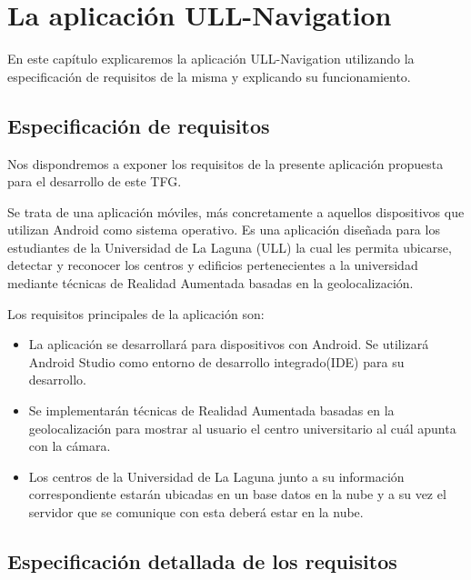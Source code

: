 %
%
%

\chapter{La aplicación ULL-Navigation} \label{chap:LaAplicacion} 

En este capítulo explicaremos la aplicación ULL-Navigation utilizando la especificación de requisitos de la misma y explicando su funcionamiento.

\section{Especificación de requisitos} %

Nos dispondremos a exponer los requisitos de la presente aplicación propuesta para el desarrollo de este TFG.

Se trata de una aplicación móviles, más concretamente a aquellos dispositivos que utilizan Android como sistema operativo. Es una aplicación diseñada para los estudiantes de la Universidad de La Laguna (ULL) la cual les permita ubicarse, detectar y reconocer los centros y edificios pertenecientes a la universidad mediante técnicas de Realidad Aumentada basadas en la geolocalización.

Los requisitos principales de la aplicación son:
\begin{itemize}
    \item La aplicación se desarrollará para dispositivos con Android. Se utilizará Android Studio como entorno de desarrollo integrado(IDE) para su desarrollo.
    \item Se implementarán técnicas de Realidad Aumentada basadas en la geolocalización para mostrar al usuario el centro universitario al cuál apunta con la cámara.
    \item Los centros de la Universidad de La Laguna junto a su información correspondiente estarán ubicadas en un base datos en la nube y a su vez el servidor que se comunique con esta deberá estar en la nube.
\end{itemize}


\section{Especificación detallada de los requisitos} 

